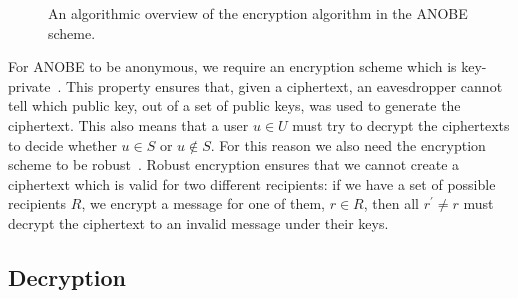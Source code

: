 \begin{frame}
  \begin{figure}
    \caption{%
      An algorithmic overview of the encryption algorithm in the \ac{ANOBE} 
      scheme.
    }\label{EncANOBE}
  \end{figure}
\end{frame}

For \ac{ANOBE} to be anonymous, we require an encryption scheme which is 
key-private~\cite{KeyPrivacy}.
This property ensures that, given a ciphertext, an eavesdropper cannot tell 
which public key, out of a set of public keys, was used to generate the 
ciphertext.
This also means that a user \(u\in U\) must try to decrypt the ciphertexts to 
decide whether \(u\in S\) or \(u\notin S\).
For this reason we also need the encryption scheme to be 
robust~\cite{RobustEncryption}.
Robust encryption ensures that we cannot create a ciphertext which is valid for 
two different recipients:
if we have a set of possible recipients \(R\), we encrypt a message for one of 
them, \(r\in R\), then all \(r^\prime\neq r\) must decrypt the ciphertext to an 
invalid message under their keys.

\subsection{Decryption}

